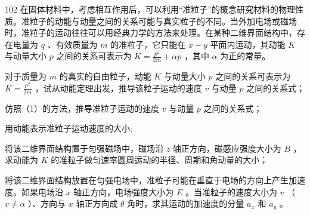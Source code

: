 \begin{problem}[第35届全国中学生物理竞赛决赛][准粒子动力学]{102}
    在固体材料中，考虑相互作用后，可以利用“准粒子”的概念研究材料的物理性质。准粒子的动能与动量之间的关系可能与真实粒子的不同。当外加电场或磁场时，准粒子的运动往往可以用经典力学的方法来处理。在某种二维界面结构中，存在电量为 $q$ 、有效质量为 $m$ 的准粒子，它只能在 $x - y$ 平面内运动，其动能 $K$ 与动量大小 $p$ 之间的关系可表示为 $K = \frac{p^2}{2m} + \alpha p$ ，其中 $\alpha$ 为正的常量。
    \begin{subproblem}
        对于质量为 $m$ 的真实的自由粒子，动能 $K$ 与动量大小 $p$ 之间的关系可表示为 $K = \frac{p^{2}}{2m}$ ，试从动能定理出发，推导该粒子运动的速度 $v$ 与动量 $p$ 之间的关系式；
    \end{subproblem}
    \begin{subproblem}
        仿照（1）的方法，推导准粒子运动的速度 $v$ 与动量 $p$ 之间的关系式；
    \end{subproblem}
    \begin{subproblem}
        用动能表示准粒子运动速度的大小;
    \end{subproblem}
    \begin{subproblem}
        将该二维界面结构置于匀强磁场中，磁场沿 $z$ 轴正方向，磁感应强度大小为 $B$ ，求动能为 $K$ 的准粒子做匀速率圆周运动的半径、周期和角动量的大小；
    \end{subproblem}
    \begin{subproblem}
        将该二维界面结构放置在匀强电场中，准粒子可能在垂直于电场的方向上产生加速度。如果电场沿 $x$ 轴正方向，电场强度大小为 $E$ 。当准粒子的速度大小为 $v$ （ $v \neq \alpha$ ）、方向与 $x$ 轴正方向成 $\theta$ 角时，求其运动的加速度的分量 $a_x$ 和 $a_y$ 。
    \end{subproblem}
\end{problem}